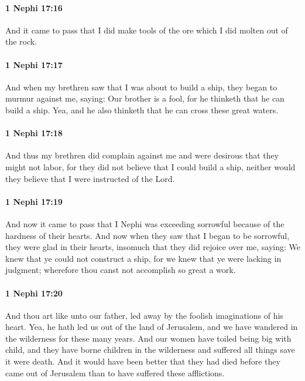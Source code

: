 		\paragraph{1 Nephi 17:16} %
			\label{1NEPHI-17-16}

			And it came to pass that I did make tools of the ore
			which I did molten out of the rock.

		\paragraph{1 Nephi 17:17} %
			\label{1NEPHI-17-17}

			And when my brethren saw that I was about to build a ship,
			they began to murmur against me, saying:
			Our brother is a fool,
			for he thinketh that he can build a ship.
			Yea, and he also thinketh that he can cross these great waters.

		\paragraph{1 Nephi 17:18} %
			\label{1NEPHI-17-18}

			And thus my brethren did complain against me
			and were desirous that they might not labor,
			for they did not believe that I could build a ship,
			neither would they believe that I were instructed of the Lord.

		\paragraph{1 Nephi 17:19} %
			\label{1NEPHI-17-19}

			And now it came to pass that I Nephi was exceeding sorrowful
			because of the hardness of their hearts.
			And now when they saw that I began to be sorrowful,
			they were glad in their hearts,
			insomuch that they did rejoice over me, saying:
			We knew that ye could not construct a ship,
			for we knew that ye were lacking in judgment;
			wherefore thou canst not accomplish so great a work.

		\paragraph{1 Nephi 17:20} %
			\label{1NEPHI-17-20}

			And thou art like unto our father,
			led away by the foolish imaginations of his heart.
			Yea, he hath led us out of the land of Jerusalem,
			and we have wandered in the wilderness for these many years.
			And our women have toiled being big with child,
			and they have borne children in the wilderness
			and suffered all things save it were death.
			And it would have been better that they had died
			before they came out of Jerusalem
			than to have suffered these afflictions.

